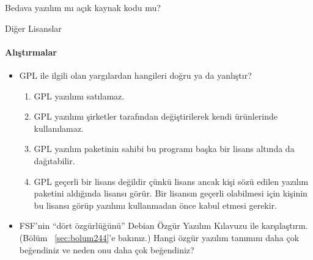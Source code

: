 \begin{section}{Bedava yazılım mı açık kaynak kodu mu?}
\begin{subsection}{Diğer Lisanslar}
\paragraph{Alıştırmalar}{
\begin{itemize}
 \item GPL ile ilgili olan yargılardan hangileri doğru ya da yanlıştır?
 \begin{enumerate}
 \item GPL yazılımı satılamaz.
 \item GPL yazılımı şirketler tarafından değiştirilerek kendi ürünlerinde kullanılamaz.
 \item GPL yazılım paketinin sahibi bu programı başka bir lisans altında da dağıtabilir.
 \item GPL geçerli bir lisans değildir çünkü lisans ancak kişi sözü edilen yazılım paketini aldığında lisansı görür. Bir lisansın geçerli olabilmesi için kişinin bu lisansı görüp yazılımı kullanmadan önce kabul etmesi gerekir.
 \end{enumerate}
 \item FSF'nin “dört özgürlüğünü” Debian Özgür Yazılım Kılavuzu ile karşılaştırın. (Bölüm ~\ref{sec:bolum244}'e bakınız.) Hangi özgür yazılım tanımını daha çok beğendiniz ve neden onu daha çok beğendiniz?
\end{itemize}}
\end{subsection}
\end{section}
